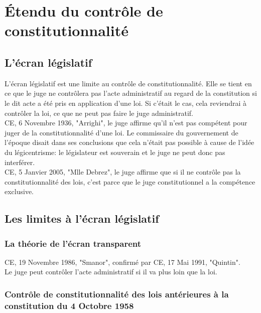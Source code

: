 \documentclass[10pt, a4paper, openany]{book}
\begin{document}
\section{Étendu du contrôle de constitutionnalité}

\subsection{L'écran législatif}

L'écran législatif est une limite au contrôle de constitutionnalité. Elle se tient en ce que le juge ne contrôlera pas l'acte administratif au regard de la constitution si le dit acte a été pris en application d'une loi. Si c'était le cas, cela reviendrai à contrôler la loi, ce que ne peut pas faire le juge administratif. \\
CE, 6 Novembre 1936, "Arrighi", le juge affirme qu'il n'est pas compétent pour juger de la constitutionnalité d'une loi. Le commissaire du gouvernement de l'époque disait dans ses conclusions que cela n'était pas possible à cause de l'idée du légicentrisme: le législateur est souverain et le juge ne peut donc pas interférer. \\
CE, 5 Janvier 2005, "Mlle Debrez", le juge affirme que si il ne contrôle pas la constitutionnalité des lois, c'est parce que le juge constitutionnel a la compétence exclusive. 

\subsection{Les limites à l'écran législatif}

\subsubsection{La théorie de l'écran transparent}

CE, 19 Novembre 1986, "Smanor", confirmé par CE, 17 Mai 1991, "Quintin". \\
Le juge peut contrôler l'acte administratif si il va plus loin que la loi. 

\subsubsection{Contrôle de constitutionnalité des lois antérieures à la constitution du 4 Octobre 1958}
\end{document}
